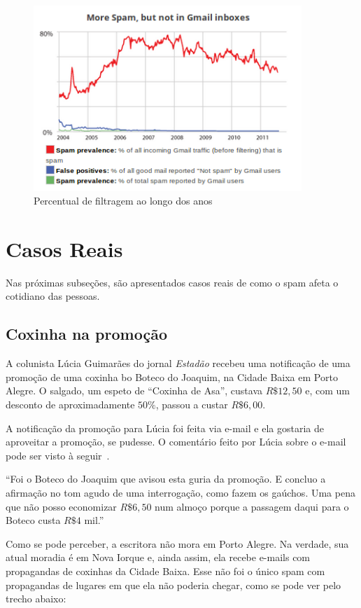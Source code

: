 \documentclass[a4paper,dvipdfm]{article}
\begin{document}
		\begin{figure}[ht]
			\centering
			\includegraphics[height=7cm]{Imagens/gmail/spamchart.png}
			\caption{Percentual de filtragem ao longo dos anos}
			\label{gmail:chart}
		\end{figure}

\newpage
\section{Casos Reais}
	Nas próximas subseções, são apresentados casos reais de como o spam afeta o cotidiano das pessoas.

	\subsection {Coxinha na promoção}
		A colunista Lúcia Guimarães do jornal \emph{Estadão} recebeu uma notificação de uma promoção de uma coxinha bo Boteco do Joaquim, na Cidade Baixa em Porto Alegre.
		O salgado, um espeto de ``Coxinha de Asa'', custava $R\$12,50$ e, com um desconto de aproximadamente $50\%$, passou a custar $R\$6,00$.

		A notificação da promoção para Lúcia foi feita via e-mail e ela gostaria de aproveitar a promoção, se pudesse.
		O comentário feito por Lúcia sobre o e-mail pode ser visto à seguir~\cite{cr:coxinha}.

		``Foi o Boteco do Joaquim que avisou esta guria da promoção. E concluo a afirmação no tom agudo de uma interrogação, como fazem os gaúchos. Uma pena que não posso economizar $R\$ 6,50$ num almoço porque a passagem daqui para o Boteco custa $R\$ 4$ mil.''

		Como se pode perceber, a escritora não mora em Porto Alegre.
		Na verdade, sua atual moradia é em Nova Iorque e, ainda assim, ela recebe e-mails com propagandas de coxinhas da Cidade Baixa.
		Esse não foi o único spam com propagandas de lugares em que ela não poderia chegar, como se pode ver pelo trecho abaixo:
\end{document}
